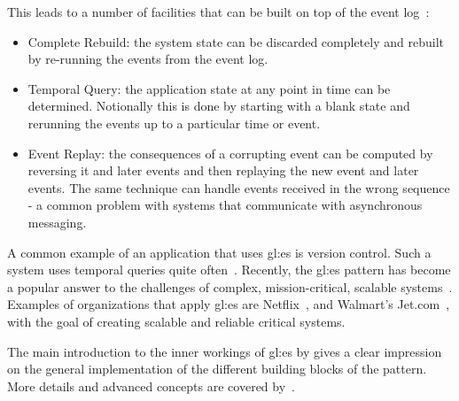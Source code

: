 This leads to a number of facilities that can be built on top of the event log~\citep{fowleres}:

\begin{itemize}
  \item Complete Rebuild: the system state can be discarded completely and rebuilt by re-running the events from the event log.
  \item Temporal Query: the application state at any point in time can be determined. Notionally this is done by starting with a blank state and rerunning the events up to a particular time or event.
  \item Event Replay: the consequences of a corrupting event can be computed by reversing it and later events and then replaying the new event and later events. The same technique can handle events received in the wrong sequence - a common problem with systems that communicate with asynchronous messaging.
\end{itemize}

A common example of an application that uses \gls{gl:es} is version control. Such a system uses temporal queries quite often~\citep{fowleres}. Recently, the \gls{gl:es} pattern has become a popular answer to the challenges of complex, mission-critical, scalable systems~\citep{OVEREEM2021110970}. Examples of organizations that apply \gls{gl:es} are Netflix~\citep{avery2017scaling}, and Walmart’s Jet.com~\citep{jet2017scaling}, with the goal of creating scalable and reliable critical systems.

The main introduction to the inner workings of \gls{gl:es} by \citep{fowleres} gives a clear impression on the general implementation of the different building blocks of the pattern. More details and advanced concepts are covered by~\citep{richardson2018microservices}.



